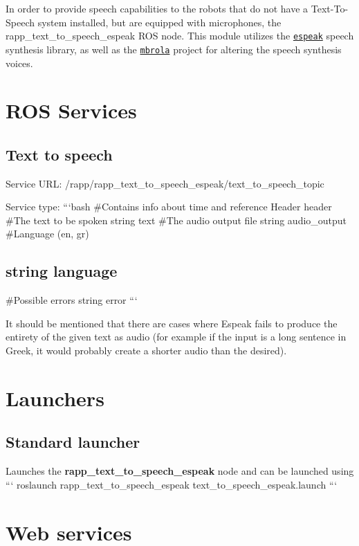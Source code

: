 In order to provide speech capabilities to the robots that do not have a Text-\/\-To-\/\-Speech system installed, but are equipped with microphones, the {\ttfamily rapp\-\_\-text\-\_\-to\-\_\-speech\-\_\-espeak} R\-O\-S node. This module utilizes the \href{http://espeak.sourceforge.net/}{\tt espeak} speech synthesis library, as well as the \href{http://tcts.fpms.ac.be/synthesis/mbrola.html}{\tt mbrola} project for altering the speech synthesis voices.

\section*{R\-O\-S Services}

\subsection*{Text to speech}

Service U\-R\-L\-: {\ttfamily /rapp/rapp\-\_\-text\-\_\-to\-\_\-speech\-\_\-espeak/text\-\_\-to\-\_\-speech\-\_\-topic}

Service type\-: ```bash \#\-Contains info about time and reference Header header \#\-The text to be spoken string text \#\-The audio output file string audio\-\_\-output \#\-Language (en, gr) \subsection*{string language }

\#\-Possible errors string error ```

It should be mentioned that there are cases where Espeak fails to produce the entirety of the given text as audio (for example if the input is a long sentence in Greek, it would probably create a shorter audio than the desired).

\section*{Launchers}

\subsection*{Standard launcher}

Launches the {\bfseries rapp\-\_\-text\-\_\-to\-\_\-speech\-\_\-espeak} node and can be launched using ``` roslaunch rapp\-\_\-text\-\_\-to\-\_\-speech\-\_\-espeak text\-\_\-to\-\_\-speech\-\_\-espeak.\-launch ```

\section*{Web services}

